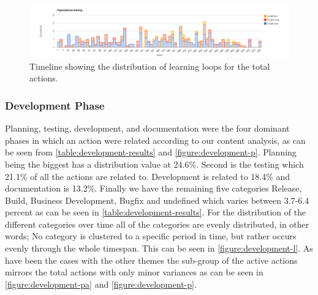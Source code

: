 \begin{figure}
	\centering
	\includegraphics[width=\textwidth, keepaspectratio]{figures/learning-l.png}
	\caption{Timeline showing the distribution of learning loops for the total actions.}
	\label{figure:learning-l}
\end{figure}
\afterpage{\clearpage}

\subsubsection{Development Phase}
Planning, testing, development, and documentation were the four dominant phases in which an action were related according to our content analysis, as can be seen from \autoref{table:development-results} and \autoref{figure:development-p}. Planning being the biggest has a distribution value at 24.6\%. Second is the testing which 21.1\% of all the actions are related to. Development is related to 18.4\% and documentation is 13.2\%. Finally we have the remaining five categories Release, Build, Business Development, Bugfix and undefined which varies between 3.7-6.4 percent as can be seen in \autoref{table:development-results}. 
For the distribution of the different categories over time all of the categories are evenly distributed, in other words; No category is clustered to a specific period in time, but rather occurs evenly through the whole timespan. This can be seen in \autoref{figure:development-l}.
As have been the cases with the other themes the sub-group of the active actions mirrors the total actions with only minor variances as can be seen in \autoref{figure:development-pa} and \autoref{figure:development-p}.

